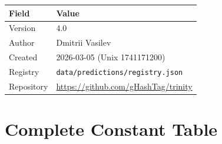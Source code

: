 \documentclass[aps,prd,preprint,superscriptaddress,showpacs,nofootinbib,longbibliography]{revtex4-2}
\begin{document}
\begin{tabular}{@{}ll@{}}
\toprule
\textbf{Field} & \textbf{Value} \\
\midrule
Version & 4.0 \\
Author & Dmitrii Vasilev \\
Created & 2026-03-05 (Unix 1741171200) \\
Registry & \texttt{data/predictions/registry.json} \\
Repository & \url{https://github.com/gHashTag/trinity} \\
\bottomrule
\end{tabular}

\section{Complete Constant Table}
\label{app:constants}
\end{document}
